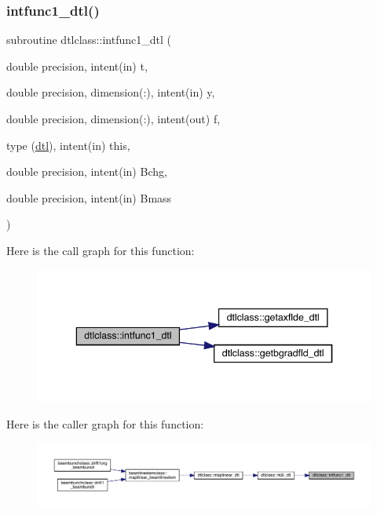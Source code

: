 \mbox{\label{namespacedtlclass_a913997c12a39f072f1a2be1576dc59d2}} 
\subsubsection{\texorpdfstring{intfunc1\_dtl()}{intfunc1\_dtl()}}
{\footnotesize\ttfamily subroutine dtlclass\+::intfunc1\+\_\+dtl (\begin{DoxyParamCaption}\item[{double precision, intent(in)}]{t,  }\item[{double precision, dimension(\+:), intent(in)}]{y,  }\item[{double precision, dimension(\+:), intent(out)}]{f,  }\item[{type (\mbox{\hyperlink{namespacedtlclass_structdtlclass_1_1dtl}{dtl}}), intent(in)}]{this,  }\item[{double precision, intent(in)}]{Bchg,  }\item[{double precision, intent(in)}]{Bmass }\end{DoxyParamCaption})}

Here is the call graph for this function\+:\nopagebreak
\begin{figure}[H]
\begin{center}
\leavevmode
\includegraphics[width=343pt]{namespacedtlclass_a913997c12a39f072f1a2be1576dc59d2_cgraph}
\end{center}
\end{figure}
Here is the caller graph for this function\+:\nopagebreak
\begin{figure}[H]
\begin{center}
\leavevmode
\includegraphics[width=350pt]{namespacedtlclass_a913997c12a39f072f1a2be1576dc59d2_icgraph}
\end{center}
\end{figure}
\mbox{\label{namespacedtlclass_afcf262e9f63f2008931d898ff6d9973a}} 
